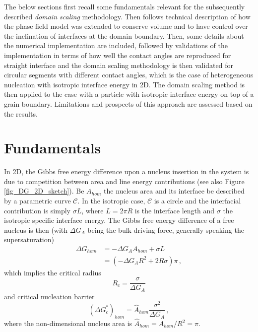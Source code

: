 The below sections first recall some fundamentals relevant for the subsequently described \textit{domain scaling} methodology. Then follows technical description of how the phase field model was extended to conserve volume and to have control over the inclination of interfaces at the domain boundary. Then, some details about the numerical implementation are included, followed by validations of the implementation in terms of how well the contact angles are reproduced for straight interface and the domain scaling methodology is then validated for circular segments with different contact angles, which is the case of heterogeneous nucleation with isotropic interface energy in 2D. The domain scaling method is then applied to the case with a particle with isotropic interface energy on top of a  grain boundary. Limitations and prospects of this approach are assessed based on the results.

%


\section{Fundamentals}
In 2D, the Gibbs free energy difference upon a nucleus insertion in the system is due to competition between area and line energy contributions (see also Figure \ref{fig_DG_2D_sketch}). Be $A_{hom}$ the nucleus area and its interface be described by a parametric curve $\mathcal{C}$. In the isotropic case, $\mathcal{C}$ is a circle and the interfacial contribution is simply $\sigma L$, where $L=2\pi R$ is the interface length and $\sigma$ the isotropic specific interface energy. The Gibbs free energy difference of a free nucleus is then (with $\Delta G_A$ being the bulk driving force, generally speaking the supersaturation)
\begin{align}
	\Delta G_{hom} &= -\Delta G_A A_{hom} + \sigma L \\
	\label{eq_DG_hom_iso}	&= (-\Delta G_A R^2 + 2R\sigma)\pi \,,
\end{align}
which implies the critical radius
\begin{equation} \label{eq_crit_radius_2D}
	R_c = \frac{\sigma}{\Delta G_A}
\end{equation}
and critical nucleation barrier
\begin{equation} \label{eq_nucl_barr_hom_2D}
	(\Delta G_c^*)_{hom} = \hat{A}_{hom}\frac{\sigma^2}{\Delta G_A}\,,
\end{equation}
where the non-dimensional nucleus area is $\hat{A}_{hom}=A_{hom}/R^2=\pi$.

